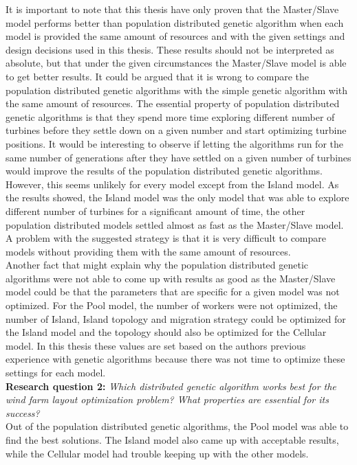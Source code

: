 \noindent It is important to note that this thesis have only proven that the Master/Slave model performs better than population distributed genetic algorithm when each model is provided the same amount of resources and with the given settings and design decisions used in this thesis. These results should not be interpreted as absolute, but that under the given circumstances the Master/Slave model is able to get better results. It could be argued that it is wrong to compare the population distributed genetic algorithms with the simple genetic algorithm with the same amount of resources. The essential property of population distributed genetic algorithms is that they spend more time exploring different number of turbines before they settle down on a given number and start optimizing turbine positions. It would be interesting to observe if letting the algorithms run for the same number of generations after they have settled on a given number of turbines would improve the results of the population distributed genetic algorithms. However, this seems unlikely for every model except from the Island model. As the results showed, the Island model was the only model that was able to explore different number of turbines for a significant amount of time, the other population distributed models settled almost as fast as the Master/Slave model. A problem with the suggested strategy is that it is very difficult to compare models without providing them with the same amount of resources.\\


\noindent Another fact that might explain why the population distributed genetic algorithms were not able to come up with results as good as the Master/Slave model could be that the parameters that are specific for a given model was not optimized. For the Pool model, the number of workers were not optimized, the number of Island, Island topology and migration strategy could be optimized for the Island model and the topology should also be optimized for the Cellular model. In this thesis these values are set based on the authors previous experience with genetic algorithms because there was not time to optimize these settings for each model.\\


\noindent \textbf{Research question 2: } \textit{Which distributed genetic algorithm works best for the wind farm layout optimization problem? What properties are essential for its success?}\\


\noindent Out of the population distributed genetic algorithms, the Pool model was able to find the best solutions. The Island model also came up with acceptable results, while the Cellular model had trouble keeping up with the other models.\\


